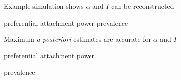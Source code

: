 \documentclass{beamer}
\begin{document}
\begin{frame}{Example simulation shows $\alpha$ and $I$ can be reconstructed}
  \begin{minipage}[p][\textheight][t]{\textwidth}
    \begin{center}
    preferential attachment power \hfill prevalence
    \end{center}
  \end{minipage}
\end{frame}

\begin{frame}{Maximum \textit{a posteriori} estimates are accurate for $\alpha$ and $I$}
  \begin{minipage}[p][\textheight][t]{\textwidth}
    \vspace{-0.5cm}
    preferential attachment power \hfill {}

    \hspace{0.75cm}

    prevalence \hfill {}
  \end{minipage}
\end{frame}
\end{document}
